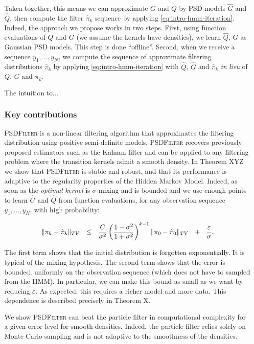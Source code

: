 Taken together, this means we can approximate $G$ and $Q$ by PSD models $\hat G$ and $\hat Q$, then compute the filter $\hat \pi_k$ sequence by applying \cref{eq:intro-hmm-iteration}. Indeed, the approach we propose works in two steps. First, using function evaluations of $Q$ and $G$ (we assume the kernels have densities), we learn $\hat Q$, $\hat G$ as Gaussian PSD models. This step is done ``offline''. Second, when we receive a sequence $y_1, \ldots, y_N$, we compute the sequence of approximate filtering distributions $\hat\pi_k$ by applying \cref{eq:intro-hmm-iteration} with $\hat Q$, $\hat G$ and $\hat \pi_k$ \emph{in lieu} of $Q$, $G$ and $\pi_k$.

The intuition to...

\subsubsection{Key contributions}
\textsc{PSDFilter} is a non-linear filtering algorithm that approximates the filtering distribution using positive semi-definite models. \textsc{PSDFilter} recovers previously proposed estimators such as the Kalman filter and can be applied to any filtering problem where the transition kernels admit a smooth density. In Theorem XYZ we show that \textsc{PSDFilter} is stable and robust, and that its performance is adaptive to the regularity properties of the Hidden Markov Model. Indeed, as soon as the \emph{optimal kernel} is $\sigma$-mixing and is bounded and we use enough points to learn $\hat G$ and $\hat Q$ from function evaluations, for any observation sequence $y_1, \ldots, y_N$, with high probability:

\begin{align}
    \Vert \pi_k - \hat\pi_k\Vert_{TV} ~~\leq~~ \frac{C}{\sigma^2}\left(\frac{1-\sigma^2}{1 + \sigma^2}\right)^{k-1}\|\pi_0 - \hat{\pi}_0\|_{TV} ~~+~~ \frac{\varepsilon}{\sigma},
\end{align}

The first term shows that the initial distribution is forgotten exponentially. It is typical of the mixing hypothesis. The second term shows that the error is bounded, uniformly on the observation sequence (which does not have to sampled from the HMM). In particular, we can make this bound as small as we want by reducing $\varepsilon$. As expected, this requires a richer model and more data. This dependence is described precisely in Theorem X.

We show \textsc{PSDFilter} can beat the particle filter in computational complexity for a given error level for smooth densities. Indeed, the particle filter relies solely on Monte Carlo sampling and is not adaptive to the smoothness of the densities.
